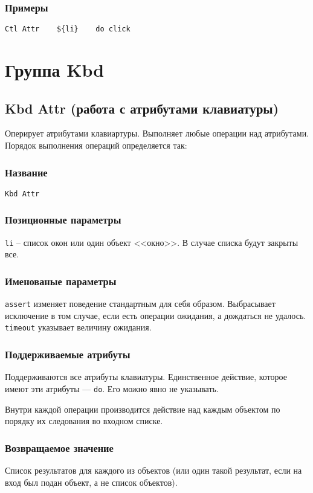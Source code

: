 \documentclass[11pt]{book} %
\begin{document}
\subsubsection*{Примеры}
\begin{verbatim}Ctl Attr    ${li}    do click\end{verbatim}

\section{Группа Kbd}


\subsection{Kbd Attr (работа с атрибутами клавиатуры)}
Оперирует атрибутами клавиартуры. Выполняет любые операции над атрибутами. Порядок выполнения операций определяется так:


\subsubsection*{Название} 
\verb"Kbd Attr"

\subsubsection*{Позиционные параметры} 
\verb"li" -- список окон или один объект <<окно>>. В случае списка будут закрыты все.

\subsubsection*{Именованые параметры} 
\verb"assert" изменяет поведение стандартным для себя образом. Выбрасывает исключение в том случае, если есть операции ожидания, а дождаться не удалось.
\verb"timeout" указывает величину ожидания.

\subsubsection*{Поддерживаемые атрибуты} 

Поддерживаются все атрибуты клавиатуры. Единственное действие, которое имеют эти атрибуты --- \verb|do|. Его можно явно не указывать.

Внутри каждой операции производится действие над каждым объектом по порядку их следования во входном списке.

\subsubsection*{Возвращаемое значение} 
Список результатов для каждого из объектов (или один такой результат, если на вход был подан объект, а не список объектов).
\end{document}
